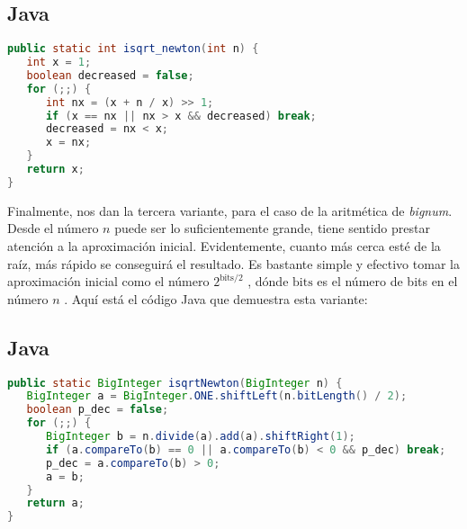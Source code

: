 \subsection{Java}
\begin{lstlisting}[language=Java]
public static int isqrt_newton(int n) {
   int x = 1;
   boolean decreased = false;
   for (;;) {
      int nx = (x + n / x) >> 1;
      if (x == nx || nx > x && decreased) break;
      decreased = nx < x;
      x = nx;
   }
   return x;
}
\end{lstlisting}

Finalmente, nos dan la tercera variante, para el caso de la aritmética de \emph{bignum}. Desde el número $n$ puede ser lo suficientemente grande, tiene sentido prestar atención a la aproximación inicial. Evidentemente, cuanto más cerca esté de la raíz, más rápido se conseguirá el resultado. Es bastante simple y efectivo tomar la aproximación inicial como el número $2^{\textrm{bits}/2}$ , dónde $\textrm{bits}$ es el número de bits en el número $n$ . Aquí está el código Java que
demuestra esta variante:

\subsection{Java}
\begin{lstlisting}[language=Java]
public static BigInteger isqrtNewton(BigInteger n) {
   BigInteger a = BigInteger.ONE.shiftLeft(n.bitLength() / 2);
   boolean p_dec = false;
   for (;;) {
      BigInteger b = n.divide(a).add(a).shiftRight(1);
      if (a.compareTo(b) == 0 || a.compareTo(b) < 0 && p_dec) break;
      p_dec = a.compareTo(b) > 0;
      a = b;
   }
   return a;
}
\end{lstlisting}